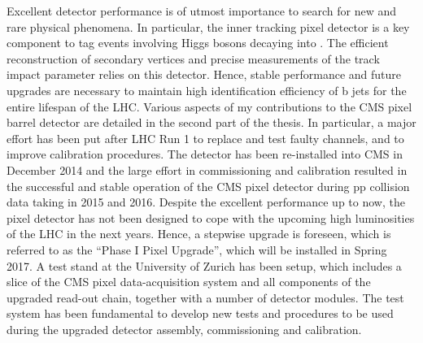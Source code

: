 Excellent detector performance is of utmost importance to search for new and rare physical phenomena.
In particular, the inner tracking pixel detector is a key component to tag events involving Higgs bosons decaying into \bbbar.
The efficient reconstruction of secondary vertices and precise measurements of the track impact parameter relies on this detector.
Hence, stable performance and future upgrades are necessary to maintain high identification efficiency of b jets for the entire lifespan of the LHC.
Various aspects of my contributions to the CMS pixel barrel detector are detailed in the second part of the thesis.
In particular, a major effort has been put after LHC Run 1 to replace and test faulty channels, and to improve calibration procedures.
The detector has been re-installed into CMS in December 2014 and the large effort in commissioning and calibration 
resulted in the successful and stable operation of the CMS pixel detector during pp collision data taking in 2015 and 2016.
Despite the excellent performance up to now, the pixel detector has not been designed to cope with the upcoming high luminosities of the LHC in the next years.
Hence, a stepwise upgrade is foreseen, which is referred to as the ``Phase I Pixel Upgrade'', which will be installed in Spring 2017.
A test stand at the University of Zurich has been setup, which includes a slice of the CMS pixel data-acquisition system and all components of the upgraded read-out chain, together with a number of detector modules.
The test system has been fundamental to develop new tests and procedures to be used during the upgraded detector assembly, commissioning and calibration.

\vspace*{\fill}
